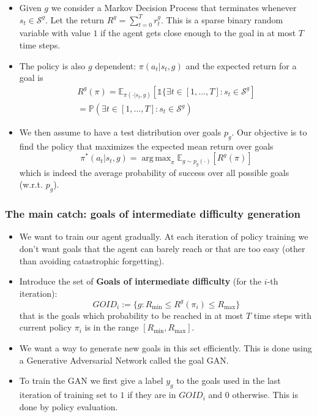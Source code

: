 \documentclass{beamer}
\theoremstyle{plain}
\theoremstyle{definition}
\theoremstyle{remark}
\newcommand{\Pro}{\mathds{P}}
\newcommand{\E}{\mathds{E}}
\DeclareMathOperator*{\argmax}{arg\,max}
\begin{document}
\begin{frame}
	\begin{itemize}
		\item Given $g$ we consider a Markov Decision Process that terminates whenever $s_t\in \mathcal{S}^g$. Let the return $R^g = \sum_{t=0}^{T}{r_t^g}$. This is a sparse binary random variable with value $1$ if the agent gets close enough to the goal in at most $T$ time steps.
		\item The policy is also $g$ dependent: $\pi(a_t|s_t,g)$ and the expected return for a goal is
			\begin{align*}
				R^g(\pi) = \E_{\pi(\cdot|s_t,g)}\left[\mathds{1}\{\exists t\in[1,\ldots, T]: s_t\in\mathcal{S}^g\right]\\
				= \Pro\left(\exists t\in[1,\ldots, T]: s_t\in\mathcal{S}^g\right)
			\end{align*}
		\item We then assume to have a test distribution over goals $p_g$. Our objective is to find the policy that maximizes the expected mean return over goals
			\begin{equation*}
				\pi^{*}(a_t|s_t,g) = \argmax_{\pi}\E_{g\sim p_g(\cdot)}[R^g(\pi)]
			\end{equation*}
			which is indeed the average probability of success over all possible goals (w.r.t. $p_g$).
	\end{itemize}
\end{frame}

\begin{frame}
	\frametitle{The main catch: goals of intermediate difficulty generation}
	\begin{itemize}
		\item We want to train our agent gradually. At each iteration of policy training we don't want goals that the agent can barely reach or that are too easy (other than avoiding catastrophic forgetting).
  		\item Introduce the set of \textbf{Goals of intermediate difficulty} (for the $i$-th iteration):
			\begin{equation*}
				GOID_i := \{g: R_{\text{min}}\leq R^g(\pi_i)\leq R_{\text{max}}\}
			\end{equation*}
			that is the goals which probability to be reached in at most $T$ time steps with current policy $\pi_i$ is in the range $[R_{\text{min}},R_{\text{max}}]$.
		\item We want a way to generate new goals in this set efficiently. This is done using a Generative Adversarial Network called the goal GAN.
  		\item To train the GAN we first give a label $y_g$ to the goals used in the last iteration of training set to $1$ if they are in $GOID_i$ and $0$ otherwise. This is done by policy evaluation.
	\end{itemize}
\end{frame}
\end{document}
